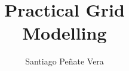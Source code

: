 \documentclass[a4paper,twoside,fleqn]{tufte-book}
\title{Practical Grid\\Modelling}
\author[]{Santiago Pe\~nate Vera}
\newcommand{\monthyear}{%
  \ifcase\month\or January\or February\or March\or April\or May\or June\or
  July\or August\or September\or October\or November\or
  December\fi\space\number\year
}
\newcommand{\openepigraph}[2]{%
  \begin{fullwidth}
  \sffamily\large
  \begin{doublespace}
  \noindent\allcaps{#1}\\%
  \noindent\allcaps{#2}%
  \end{doublespace}
  \end{fullwidth}
}
\newcommand{\blankpage}{\newpage\hbox{}\thispagestyle{empty}\newpage}
\begin{document}
\frontmatter




\maketitle

\doclicenseThis

\newpage
%
%
%
%
\end{document}
